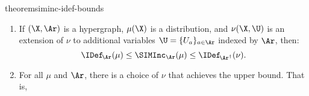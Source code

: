 \begin{linked}{theorem}{siminc-idef-bounds}
    \begin{enumerate}[label={\normalfont(\alph*)},wide,topsep=0pt,itemsep=0pt,parsep=0pt] \item
    If $(\X,\Ar)$ is a hypergraph,
     $\mu(\X)$ is a distribution, and $\nu(\X,\U)$ is an extension of $\nu$ to additional variables $\U = \{U_a \}_{a \in \Ar}$ indexed by $\Ar$, then:
    \[
        \IDef_{\!\Ar}(\mu) \le
        \SIMInc_{\Ar}(\mu)
        \le \IDef_{\!\Ar^\dagger}(\nu).
    \]
    \item 
    For all $\mu$ and $\Ar$, there is a choice of $\nu$ that achieves the upper bound.
    That is, 

\end{enumerate}
\end{linked}
